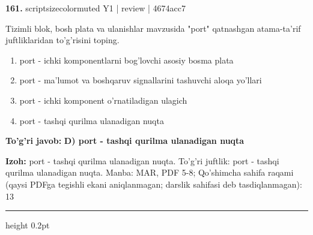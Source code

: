 \documentclass[10pt,a4paper]{article}
\begin{document}
{\bfseries\sffamily\color{ink} 161.} {scriptsizecolor{muted} Y1 | review | 4674acc7}
\par
Tizimli blok, bosh plata va ulanishlar mavzusida "port" qatnashgan atama-ta'rif juftliklaridan to'g'risini toping.
\begin{enumerate}[label=\Alph*),leftmargin=9mm]
\item port - ichki komponentlarni bog'lovchi asosiy bosma plata
\item port - ma'lumot va boshqaruv signallarini tashuvchi aloqa yo'llari
\item port - ichki komponent o'rnatiladigan ulagich
\item port - tashqi qurilma ulanadigan nuqta
\end{enumerate}
\begin{tcolorbox}[enhanced,breakable,colback=teal!4,colframe=teal!60!black,boxrule=0.45pt,arc=1.2mm,left=2.7mm,right=2.7mm,top=1.8mm,bottom=1.8mm,before skip=2mm,after skip=2mm]
{\bfseries\sffamily\color{teal}To'g'ri javob:} \textbf{D) port - tashqi qurilma ulanadigan nuqta}
\par\smallskip
{\bfseries Izoh:} port - tashqi qurilma ulanadigan nuqta. To'g'ri juftlik: port - tashqi qurilma ulanadigan nuqta. Manba: MAR, PDF 5-8; Qo'shimcha sahifa raqami (qaysi PDFga tegishli ekani aniqlanmagan; darslik sahifasi deb tasdiqlanmagan): 13
\end{tcolorbox}
\vspace{2mm}\hrule height 0.2pt\vspace{3mm}
\end{document}
